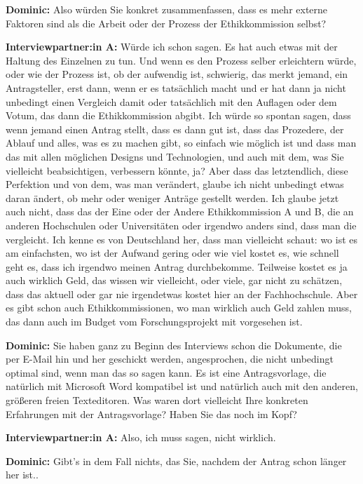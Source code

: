 \documentclass[a4paper,12pt,twoside]{scrreprt}
\begin{document}
\textbf{Dominic:} Also würden Sie konkret zusammenfassen, dass es mehr externe Faktoren sind als die Arbeit oder der Prozess der Ethikkommission selbst?

\textbf{Interviewpartner:in A:} Würde ich schon sagen. Es hat auch etwas mit der Haltung des Einzelnen zu tun. Und wenn es den Prozess selber erleichtern würde, oder wie der Prozess ist, ob der aufwendig ist, schwierig, das merkt jemand, ein Antragsteller, erst dann, wenn er es tatsächlich macht und er hat dann ja nicht unbedingt einen Vergleich damit oder tatsächlich mit den Auflagen oder dem Votum, das dann die Ethikkommission abgibt. Ich würde so spontan sagen, dass wenn jemand einen Antrag stellt, dass es dann gut ist, dass das Prozedere, der Ablauf und alles, was es zu machen gibt, so einfach wie möglich ist und dass man das mit allen möglichen Designs und Technologien, und auch mit dem, was Sie vielleicht beabsichtigen, verbessern könnte, ja? Aber dass das letztendlich, diese Perfektion und von dem, was man verändert, glaube ich nicht unbedingt etwas daran ändert, ob mehr oder weniger Anträge gestellt werden. Ich glaube jetzt auch nicht, dass das der Eine oder der Andere Ethikkommission A und B, die an anderen Hochschulen oder Universitäten oder irgendwo anders sind, dass man die vergleicht. Ich kenne es von Deutschland her, dass man vielleicht schaut: wo ist es am einfachsten, wo ist der Aufwand gering oder wie viel kostet es, wie schnell geht es, dass ich irgendwo meinen Antrag durchbekomme. Teilweise kostet es ja auch wirklich Geld, das wissen wir vielleicht, oder viele, gar nicht zu schätzen, dass das aktuell oder gar nie irgendetwas kostet hier an der Fachhochschule. Aber es gibt schon auch Ethikkommissionen, wo man wirklich auch Geld zahlen muss, das dann auch im Budget vom Forschungsprojekt mit vorgesehen ist.

\textbf{Dominic:} Sie haben ganz zu Beginn des Interviews schon die Dokumente, die per E-Mail hin und her geschickt werden, angesprochen, die nicht unbedingt optimal sind, wenn man das so sagen kann. Es ist eine Antragsvorlage, die natürlich mit Microsoft Word kompatibel ist und natürlich auch mit den anderen, größeren freien Texteditoren. Was waren dort vielleicht Ihre konkreten Erfahrungen mit der Antragsvorlage? Haben Sie das noch im Kopf?

\textbf{Interviewpartner:in A:} Also, ich muss sagen, nicht wirklich.

\textbf{Dominic:} Gibt’s in dem Fall nichts, das Sie, nachdem der Antrag schon länger her ist..
\end{document}
